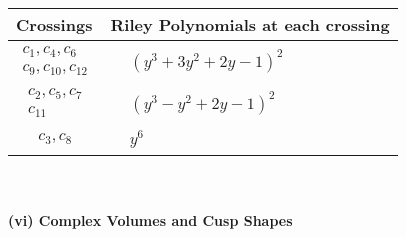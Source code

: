 \documentclass[1p]{elsarticle_modified}
\theoremstyle{definition}
\begin{document}
\begin{tabular}{m{50pt}|m{274pt}}
Crossings & \hspace{64pt}Riley Polynomials at each crossing \\
\hline $$\begin{aligned}c_{1},c_{4},c_{6}\\c_{9},c_{10},c_{12}\end{aligned}$$&$\begin{aligned}
&(y^3+3 y^2+2 y-1)^2
\end{aligned}$\\
\hline $$\begin{aligned}c_{2},c_{5},c_{7}\\c_{11}\end{aligned}$$&$\begin{aligned}
&(y^3- y^2+2 y-1)^2
\end{aligned}$\\
\hline $$\begin{aligned}c_{3},c_{8}\end{aligned}$$&$\begin{aligned}
&y^6
\end{aligned}$\\
\hline
\end{tabular}\\~\\
\newpage\flushleft \textbf{(vi) Complex Volumes and Cusp Shapes}
\end{document}
